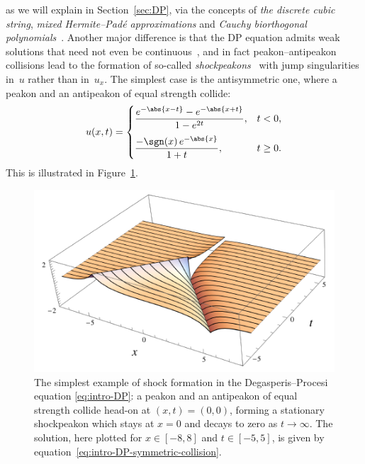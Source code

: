 \documentclass[10pt,a4paper]{article} \pdfoutput=1 
\begin{document}
as we will explain in Section~\ref{sec:DP},
via the concepts of \emph{the discrete cubic string},
\emph{mixed Hermite--Padé approximations}
and \emph{Cauchy biorthogonal polynomials}~\cite{lundmark-szmigielski:2003:DPshort,lundmark-szmigielski:2005:DPlong,bertola-gekhtman-szmigielski:2009:cubicstring,bertola-gekhtman-szmigielski:2010:cauchy}.
Another major difference is that the DP equation admits weak solutions that need not
even be continuous~\cite{coclite-karlsen:2006:DPwellposedness, coclite-karlsen:2007:DPuniqueness},
and in fact peakon--antipeakon collisions lead to the formation
of so-called \emph{shock\-peakons}~\cite{lundmark:2007:DP-shockpeakons}
with jump singularities in~$u$ rather than in~$u_x$.
The simplest case is the antisymmetric one,
where a peakon and an antipeakon of equal strength collide:
\begin{equation}
  \label{eq:intro-DP-symmetric-collision}
  u(x,t) =
  \begin{cases}
    \dfrac{e^{-\abs{x-t}} - e^{-\abs{x+t}}}{1-e^{2t}}
    ,&
    t < 0
    ,\\[1em]
    \dfrac{- \sgn(x) \, e^{-\abs{x}}}{1+t}
    ,&
    t \ge 0
    .
  \end{cases}
\end{equation}
This is illustrated in Figure~\ref{fig:DP-symmetric-collision}.

\begin{figure}
  \centering
  \includegraphics[width=0.95\linewidth]{graphics/DP-symmetric-collision-labels.pdf}
  \caption{The simplest example of shock formation in the Degasperis--Procesi equation
    \eqref{eq:intro-DP}:
    a peakon and an antipeakon of equal strength collide head-on at $(x,t)=(0,0)$,
    forming a stationary shockpeakon which stays at $x=0$ and decays to zero
    as $t \to \infty$.
    The solution, here plotted for $x \in [-8,8]$ and $t \in [-5,5]$,
    is given by equation~\eqref{eq:intro-DP-symmetric-collision}.
  }
  \label{fig:DP-symmetric-collision}
\end{figure}
\end{document}
